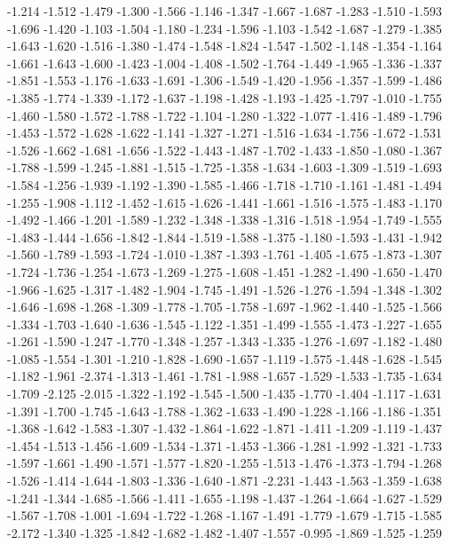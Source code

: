 \documentclass[9pt]{article}
\theoremstyle{plain}
\theoremstyle{definition}
\theoremstyle{remark}
\numberwithin{equation}{section}
\begin{document}
-1.214
-1.512
-1.479
-1.300
-1.566
-1.146
-1.347
-1.667
-1.687
-1.283
-1.510
-1.593
-1.696
-1.420
-1.103
-1.504
-1.180
-1.234
-1.596
-1.103
-1.542
-1.687
-1.279
-1.385
-1.643
-1.620
-1.516
-1.380
-1.474
-1.548
-1.824
-1.547
-1.502
-1.148
-1.354
-1.164
-1.661
-1.643
-1.600
-1.423
-1.004
-1.408
-1.502
-1.764
-1.449
-1.965
-1.336
-1.337
-1.851
-1.553
-1.176
-1.633
-1.691
-1.306
-1.549
-1.420
-1.956
-1.357
-1.599
-1.486
-1.385
-1.774
-1.339
-1.172
-1.637
-1.198
-1.428
-1.193
-1.425
-1.797
-1.010
-1.755
-1.460
-1.580
-1.572
-1.788
-1.722
-1.104
-1.280
-1.322
-1.077
-1.416
-1.489
-1.796
-1.453
-1.572
-1.628
-1.622
-1.141
-1.327
-1.271
-1.516
-1.634
-1.756
-1.672
-1.531
-1.526
-1.662
-1.681
-1.656
-1.522
-1.443
-1.487
-1.702
-1.433
-1.850
-1.080
-1.367
-1.788
-1.599
-1.245
-1.881
-1.515
-1.725
-1.358
-1.634
-1.603
-1.309
-1.519
-1.693
-1.584
-1.256
-1.939
-1.192
-1.390
-1.585
-1.466
-1.718
-1.710
-1.161
-1.481
-1.494
-1.255
-1.908
-1.112
-1.452
-1.615
-1.626
-1.441
-1.661
-1.516
-1.575
-1.483
-1.170
-1.492
-1.466
-1.201
-1.589
-1.232
-1.348
-1.338
-1.316
-1.518
-1.954
-1.749
-1.555
-1.483
-1.444
-1.656
-1.842
-1.844
-1.519
-1.588
-1.375
-1.180
-1.593
-1.431
-1.942
-1.560
-1.789
-1.593
-1.724
-1.010
-1.387
-1.393
-1.761
-1.405
-1.675
-1.873
-1.307
-1.724
-1.736
-1.254
-1.673
-1.269
-1.275
-1.608
-1.451
-1.282
-1.490
-1.650
-1.470
-1.966
-1.625
-1.317
-1.482
-1.904
-1.745
-1.491
-1.526
-1.276
-1.594
-1.348
-1.302
-1.646
-1.698
-1.268
-1.309
-1.778
-1.705
-1.758
-1.697
-1.962
-1.440
-1.525
-1.566
-1.334
-1.703
-1.640
-1.636
-1.545
-1.122
-1.351
-1.499
-1.555
-1.473
-1.227
-1.655
-1.261
-1.590
-1.247
-1.770
-1.348
-1.257
-1.343
-1.335
-1.276
-1.697
-1.182
-1.480
-1.085
-1.554
-1.301
-1.210
-1.828
-1.690
-1.657
-1.119
-1.575
-1.448
-1.628
-1.545
-1.182
-1.961
-2.374
-1.313
-1.461
-1.781
-1.988
-1.657
-1.529
-1.533
-1.735
-1.634
-1.709
-2.125
-2.015
-1.322
-1.192
-1.545
-1.500
-1.435
-1.770
-1.404
-1.117
-1.631
-1.391
-1.700
-1.745
-1.643
-1.788
-1.362
-1.633
-1.490
-1.228
-1.166
-1.186
-1.351
-1.368
-1.642
-1.583
-1.307
-1.432
-1.864
-1.622
-1.871
-1.411
-1.209
-1.119
-1.437
-1.454
-1.513
-1.456
-1.609
-1.534
-1.371
-1.453
-1.366
-1.281
-1.992
-1.321
-1.733
-1.597
-1.661
-1.490
-1.571
-1.577
-1.820
-1.255
-1.513
-1.476
-1.373
-1.794
-1.268
-1.526
-1.414
-1.644
-1.803
-1.336
-1.640
-1.871
-2.231
-1.443
-1.563
-1.359
-1.638
-1.241
-1.344
-1.685
-1.566
-1.411
-1.655
-1.198
-1.437
-1.264
-1.664
-1.627
-1.529
-1.567
-1.708
-1.001
-1.694
-1.722
-1.268
-1.167
-1.491
-1.779
-1.679
-1.715
-1.585
-2.172
-1.340
-1.325
-1.842
-1.682
-1.482
-1.407
-1.557
-0.995
-1.869
-1.525
-1.259
\end{document}
